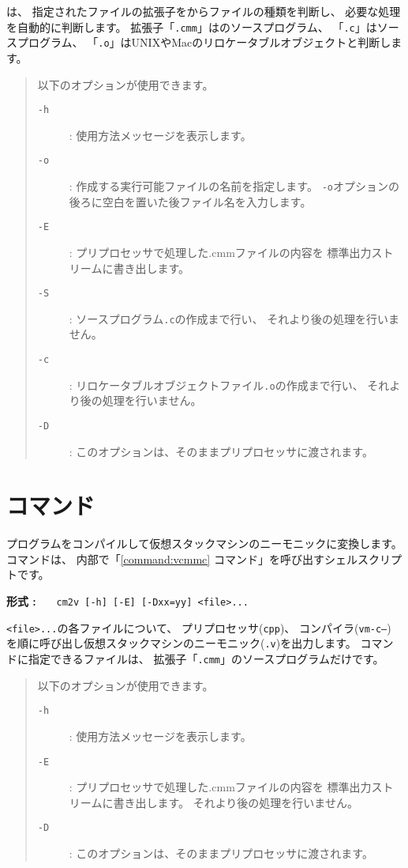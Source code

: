 {\cmc}は、
指定されたファイルの拡張子をからファイルの種類を判断し、
必要な処理を自動的に判断します。
拡張子「{\tt .cmm}」は{\cmml}のソースプログラム、
「{\tt .c}」は{\cl}ソースプログラム、
「{\tt .o}」はUNIXやMacのリロケータブルオブジェクトと判断します。

\begin{quote}
\hspace{-1em}以下のオプションが使用できます。

\begin{description}
\item[{\tt -h}] : 使用方法メッセージを表示します。
\item[{\tt -o}] : 作成する実行可能ファイルの名前を指定します。
{\tt -o}オプションの後ろに空白を置いた後ファイル名を入力します。
\item[{\tt -E}] : プリプロセッサで処理した{.cmm}ファイルの内容を
標準出力ストリームに書き出します。
\item[{\tt -S}] : {\cl}ソースプログラム{\tt .c}の作成まで行い、
それより後の処理を行いません。
\item[{\tt -c}] : リロケータブルオブジェクトファイル{\tt .o}の作成まで行い、
それより後の処理を行いません。
\item[{\tt -D}] : このオプションは、そのままプリプロセッサに渡されます。
\end{description}
\end{quote}

\section{{\cmv}コマンド}

{\cmm}プログラムをコンパイルして仮想スタックマシンのニーモニックに変換します。
{\cmv}コマンドは、
内部で「\ref{command:vcmmc} {\vcmmc}コマンド」を呼び出すシェルスクリプトです。

\begin{flushleft}
{\bf 形式 : }~~~\verb/cm2v [-h] [-E] [-Dxx=yy] <file>.../
\end{flushleft}

{\tt <file>...}の各ファイルについて、
プリプロセッサ({\tt cpp})、
コンパイラ({\tt vm-c--})
を順に呼び出し仮想スタックマシンのニーモニック({\tt .v})を出力します。
{\cmv}コマンドに指定できるファイルは、
拡張子「{\tt .cmm}」の{\cmml}ソースプログラムだけです。

\begin{quote}
\hspace{-1em}以下のオプションが使用できます。

\begin{description}
\item[{\tt -h}] : 使用方法メッセージを表示します。
\item[{\tt -E}] : プリプロセッサで処理した{.cmm}ファイルの内容を
標準出力ストリームに書き出します。
それより後の処理を行いません。
\item[{\tt -D}] : このオプションは、そのままプリプロセッサに渡されます。
\end{description}
\end{quote}

